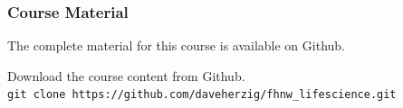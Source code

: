 \begin{frame}[fragile]
  \frametitle{Course Material}
  The complete material for this course is available on Github.\\
  \begin{exercise}
  Download the course content from Github.\\
  \verb|git clone https://github.com/daveherzig/fhnw_lifescience.git|
  \end{exercise}
\end{frame}
